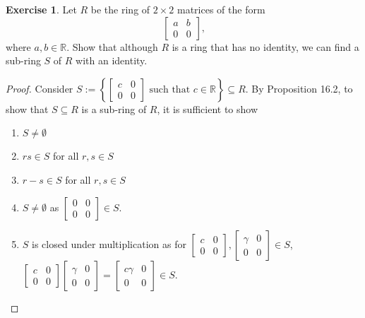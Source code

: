 \documentclass{article}
\theoremstyle{definition}
\newtheorem{theorem}{Exercise}[section]
\theoremstyle{plain}
\newcommand{\R}{\mathbb{R}}
\begin{document}
	\begin{theorem}
		Let $R$ be the ring of $2 \times 2$ matrices of the form \[\begin{bmatrix} a & b \\ 0 & 0 \end{bmatrix}\text{,} \] where $a,b \in \R$. Show that although $R$ is a ring that has no identity, we can find a sub-ring $S$ of $R$ with an identity. 
	\end{theorem}
	\begin{proof}
		Consider $S := \left\{ \left[ \begin{smallmatrix} c & 0 \\ 0 & 0\end{smallmatrix} \right] \text{ such that } c \in \R \right\} \subseteq R$. By Proposition 16.2, to show that $S \subseteq R$ is a sub-ring of $R$, it is sufficient to show
		\begin{enumerate}
			\item $S \not= \emptyset$
			\item $rs \in S$ for all $r, s\in S$
			\item $r-s \in S$ for all $r, s\in S$
			\setcounter{enumi}{0}
			\item $S \not= \emptyset$ as $\left[ \begin{smallmatrix} 0 & 0 \\ 0 & 0\end{smallmatrix} \right] \in S$. \checkmark
			\item $S$ is closed under multiplication as for $\left[ \begin{smallmatrix} c & 0 \\ 0 & 0\end{smallmatrix} \right], \left[ \begin{smallmatrix} \gamma & 0 \\ 0 & 0\end{smallmatrix} \right] \in S$, $\left[ \begin{smallmatrix} c & 0 \\ 0 & 0\end{smallmatrix} \right] \left[ \begin{smallmatrix} \gamma & 0 \\ 0 & 0\end{smallmatrix} \right] = \left[ \begin{smallmatrix} c\gamma & 0 \\ 0 & 0\end{smallmatrix} \right] \in S$. \checkmark 

\end{enumerate}
\end{proof}
\end{document}
